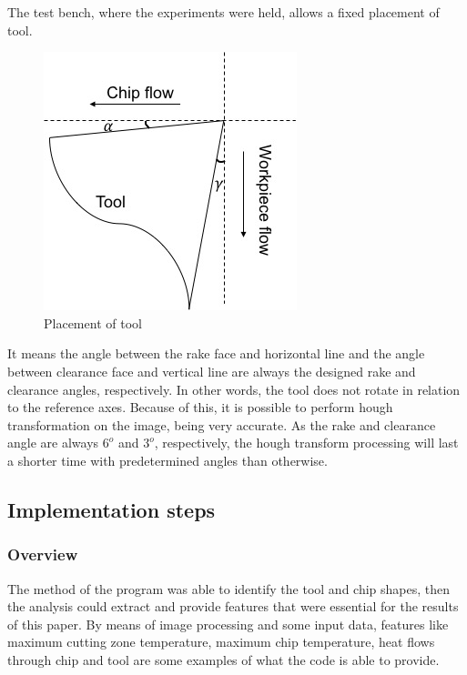 			The test bench, where the experiments were held, allows a fixed placement of tool.

			\begin{figure}[H]
				\centering
				\captionsetup{justification=centering}
				\includegraphics[scale = 0.65]{Cap4/imgset.jpg}
				\caption{Placement of tool}
				\label{fig:imgset}
			\end{figure}

			It means the angle between the rake face and horizontal line and the angle between clearance face and vertical line are always the designed rake and clearance angles, respectively. In other words, the tool does not rotate in relation to the reference axes. Because of this, it is possible to perform hough transformation on the image, being very accurate. As the rake and clearance angle are always $6^{o}$ and $3^{o}$, respectively, the hough transform processing will last a shorter time with predetermined angles than otherwise.

	\subsection{Implementation steps}
		\subsubsection{Overview}	

			The method of the program was able to identify the tool and chip shapes, then the analysis could extract and provide features that were essential for the results of this paper. By means of image processing and some input data, features like maximum cutting zone temperature, maximum chip temperature, heat flows through chip and tool are some examples of what the code is able to provide.	
			
